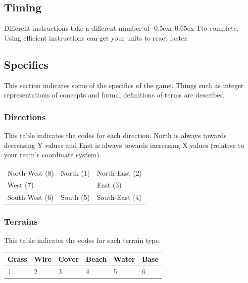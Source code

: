 \documentclass{article}
\newcommand{\RT}{\lower-0.5ex\hbox{r}\kern-0.65ex T}
\begin{document}
\subsection{Timing}

Different instructions take a different number of \RT to complete. Using
efficient instructions can get your units to react faster.

\subsection{Specifics}

This section indicates some of the specifics of the game. Things such as integer
representations of concepts and formal definitions of terms are described.

\subsubsection{Directions}

This table indicates the codes for each direction. North is always towards
decreasing Y values and East is always towards increasing X values (relative to
your team's coordinate system).

\begin{minipage}{\textwidth}
\centering
\begin{tabular}{lll}
    North-West (8) & North (1) & North-East (2) \\
    West (7) & & East (3) \\
    South-West (6) & South (5) & South-East (4) \\
\end{tabular}
\end{minipage}

\subsubsection{Terrains}

This table indicates the codes for each terrain type.

\begin{minipage}{\textwidth}
\centering
\begin{tabular}{llllll}
    Grass & Wire & Cover & Beach & Water & Base \\ \hline
    1 & 2 & 3 & 4 & 5 & 6
\end{tabular}
\end{minipage}
\end{document}

